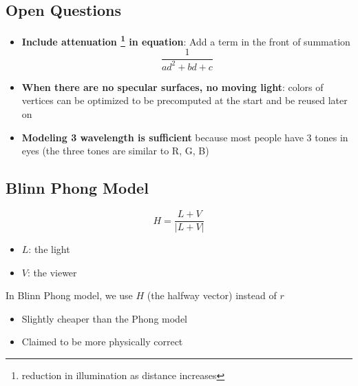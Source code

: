 \subsection{Open Questions}

  \begin{itemize}
    \item \textbf{Include attenuation
    \footnote{reduction in illumination as distance increases} in equation}:
    Add a term in the front of summation
    \begin{equation*}
      \frac{1}{ad^{2} + bd + c}
    \end{equation*}

    \item \textbf{When there are no specular surfaces, no moving light}:
    colors of vertices can be optimized to be precomputed at the start and
    be reused later on

    \item \textbf{Modeling 3 wavelength is sufficient} because most people
    have 3 tones in eyes (the three tones are similar to R, G, B)
  \end{itemize}

\subsection{Blinn Phong Model}

  \begin{equation}
    H = \frac{L + V}{\left| L + V \right|}
  \end{equation}

  \begin{itemize}
    \item $ L $: the light
    \item $ V $: the viewer
  \end{itemize}

  In Blinn Phong model, we use $ H $ (the halfway vector) instead of $ r $

  \begin{itemize}
    \item Slightly cheaper than the Phong model
    \item Claimed to be more physically correct
  \end{itemize}
